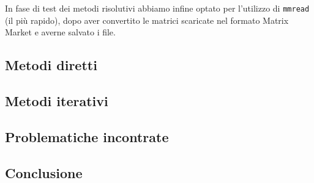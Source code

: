 \documentclass[11pt,a4paper]{scrartcl}
\begin{document}
In fase di test dei metodi risolutivi abbiamo infine optato per l'utilizzo di \texttt{mmread} (il più rapido), dopo aver convertito le matrici scaricate nel formato Matrix Market e averne salvato i file.

\subsection*{Metodi diretti}

\subsection*{Metodi iterativi}

\subsection*{Problematiche incontrate}

\subsection*{Conclusione}
\end{document}
